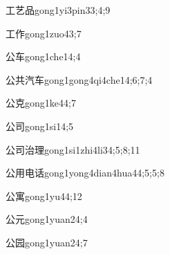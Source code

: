 \begin{verbete}{工艺品}{gong1yi3pin3}{3;4;9}
\end{verbete}

\begin{verbete}{工作}{gong1zuo4}{3;7}
\end{verbete}

\begin{verbete}{公车}{gong1che1}{4;4}
\end{verbete}

\begin{verbete}{公共汽车}{gong1gong4qi4che1}{4;6;7;4}
\end{verbete}

\begin{verbete}{公克}{gong1ke4}{4;7}
\end{verbete}

\begin{verbete}{公司}{gong1si1}{4;5}
\end{verbete}

\begin{verbete}{公司治理}{gong1si1zhi4li3}{4;5;8;11}
\end{verbete}

\begin{verbete}{公用电话}{gong1yong4dian4hua4}{4;5;5;8}
\end{verbete}

\begin{verbete}{公寓}{gong1yu4}{4;12}
\end{verbete}

\begin{verbete}{公元}{gong1yuan2}{4;4}
\end{verbete}

\begin{verbete}{公园}{gong1yuan2}{4;7}
\end{verbete}


